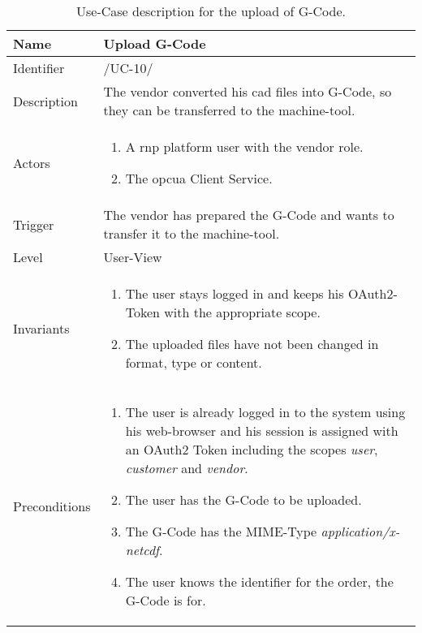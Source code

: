 \documentclass[
a4paper,
twoside,
headsepline,
cleardoublepage=empty,
parskip=half,
draft=false
]{scrbook}
\begin{document}
				\begin{table}[hbtp]
					\centering
					\caption{Use-Case description for the upload of G-Code.}
					\label{tab:use_case_upload}
					\begin{tabular}{L R}%
						\toprule
						Name & Upload G-Code
						\\ \midrule
						Identifier & /UC-10/
						\\ \midrule
						Description & The vendor converted his \gls{cad} files into G-Code, so they can be transferred to the machine-tool.
						\\ \midrule
						Actors & \begin{enumerate}\item A \gls{rnp} platform user with the vendor role. \item The \gls{opcua} Client Service.\end{enumerate}
						\\ \midrule
						Trigger & The vendor has prepared the G-Code and wants to transfer it to the machine-tool.
						\\ \midrule
						Level & User-View
						\\ \midrule
						Invariants & \begin{enumerate}\item The user stays logged in and keeps his OAuth2-Token with the appropriate scope. \item The uploaded files have not been changed in format, type or content.\end{enumerate}
						\\ \midrule
						Preconditions &
						\begin{enumerate}
							\item The user is already logged in to the system using his web-browser and his session is assigned with an OAuth2 Token including the scopes \textit{user}, \textit{customer} and \textit{vendor}.
							\item The user has the G-Code to be uploaded.
							\item The G-Code has the MIME-Type \textit{application/x-netcdf}.
							\item The user knows the identifier for the order, the G-Code is for.
						\end{enumerate}
						\\ \midrule

\end{tabular}
\end{table}
\end{document}

